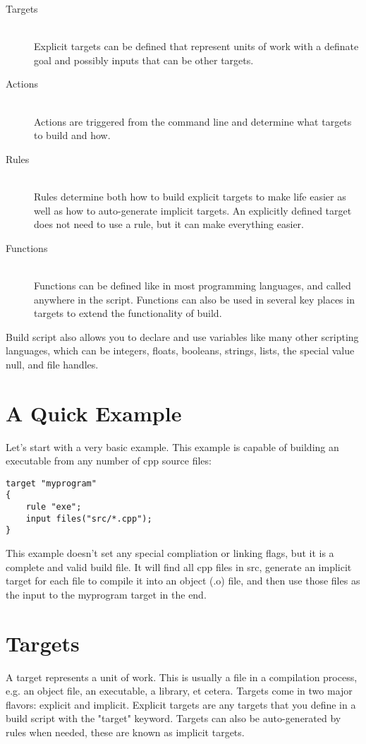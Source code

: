 \documentclass[letterpaper]{book}
\begin{document}
\begin{description}
    \item[Targets] \hfill \\
    Explicit targets can be defined that represent units of work with a definate
    goal and possibly inputs that can be other targets.
    \item[Actions] \hfill \\
    Actions are triggered from the command line and determine what targets to
    build and how.
    \item[Rules] \hfill \\
    Rules determine both how to build explicit targets to make life easier as
    well as how to auto-generate implicit targets.  An explicitly defined target
    does not need to use a rule, but it can make everything easier.
    \item[Functions] \hfill \\
    Functions can be defined like in most programming languages, and called
    anywhere in the script.  Functions can also be used in several key places in
    targets to extend the functionality of build.
\end{description}

Build script also allows you to declare and use variables like many other
scripting languages, which can be integers, floats, booleans, strings, lists,
the special value null, and file handles.

\section{A Quick Example}
Let's start with a very basic example.  This example is capable of building an
executable from any number of cpp source files:

\begin{lstlisting}
target "myprogram"
{
    rule "exe";
    input files("src/*.cpp");
}
\end{lstlisting}

This example doesn't set any special compliation or linking flags, but it is a
complete and valid build file.  It will find all cpp files in src, generate an
implicit target for each file to compile it into an object (.o) file, and then
use those files as the input to the myprogram target in the end.

\section{Targets}
A target represents a unit of work.  This is usually a file in a compilation
process, e.g. an object file, an executable, a library, et cetera.  Targets
come in two major flavors: explicit and implicit.  Explicit targets are any
targets that you define in a build script with the "target" keyword.  Targets
can also be auto-generated by rules when needed, these are known as implicit
targets.
\end{document}
